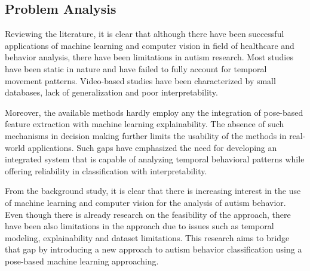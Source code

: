\subsection{Problem Analysis}

Reviewing the literature, it is clear that although there have been successful applications of machine learning and computer vision in field of healthcare and behavior analysis, there have been limitations in autism research. Most studies have been static in nature and have failed to fully account for temporal movement patterns. Video-based studies have been characterized by small databases, lack of generalization and poor interpretability.

Moreover, the available methods hardly employ any the integration of pose-based feature extraction with machine learning explainability. The absence of such mechanisms in decision making further limits the usability of the methods in real-world applications. Such gaps have emphasized the need for developing an integrated system that is capable of analyzing temporal behavioral patterns while offering reliability in classification with interpretability.


From the background study, it is clear that there is increasing interest in the use of machine learning and computer vision for the analysis of autism behavior. Even though there is already research on the feasibility of the approach, there have been also limitations in the approach due to issues such as temporal modeling, explainability and dataset limitations. This research aims to bridge that gap by introducing a new approach to autism behavior classification using a pose-based machine learning approaching.
